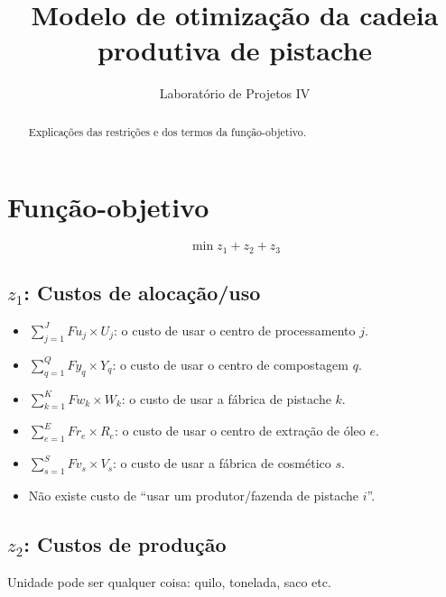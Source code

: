 \documentclass[]{article}
\title{Modelo de otimização da cadeia produtiva de pistache}
\author{Laboratório de Projetos IV}
\begin{document}
\maketitle

\begin{abstract}
	Explicações das restrições e dos termos da função-objetivo.
\end{abstract}

	\section{Função-objetivo}
	
		\begin{equation}
			\min z_1 + z_2 + z_3
		\end{equation}
	
		\subsection{$z_1$: Custos de alocação/uso}

			\begin{itemize}
				\item $\sum\limits_{j=1}^J Fu_j\times U_j$: o custo de usar o centro de processamento $j$.
				\item $\sum\limits_{q=1}^Q Fy_q\times Y_q$: o custo de usar o centro de compostagem $q$.
				\item $\sum\limits_{k=1}^{K} Fw_k\times W_k$: o custo de usar a fábrica de pistache $k$.
				\item $\sum\limits_{e=1}^{E} Fr_e\times R_e$: o custo de usar o centro de extração de óleo $e$.
				\item $\sum\limits_{s=1}^{S} Fv_s\times V_s$: o custo de usar a fábrica de cosmético $s$.
				\item Não existe custo de ``usar um produtor/fazenda de pistache $i$''.
			\end{itemize}
		
		\subsection{$z_2$: Custos de produção}
		
			Unidade pode ser qualquer coisa: quilo, tonelada, saco etc.
		
\end{document}
